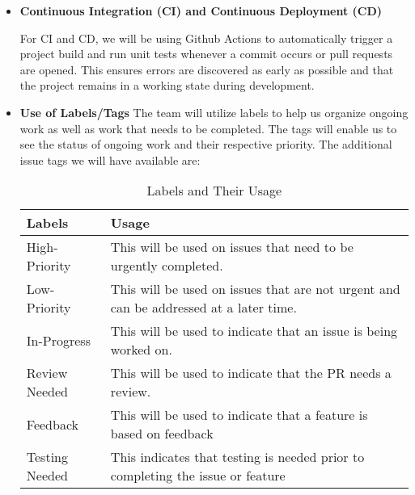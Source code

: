 \documentclass{article}
\begin{document}
\begin{itemize}
	\item\textbf{Continuous Integration (CI) and Continuous Deployment (CD)}
	
  For CI and CD, we will be using Github Actions to automatically trigger a project build and run unit tests 
  whenever a commit occurs or pull requests are opened. This ensures errors are discovered as early as possible 
  and that the project remains in a working state during development. 

  \item \textbf{Use of Labels/Tags} \newline
  The team will utilize labels to help us organize ongoing work as well as work that needs to be completed. The tags will enable us to see the status of ongoing work and their respective priority. 
    The additional issue tags we will have available are:

    \begin{table}[!htbp]
      \centering
      \caption{Labels and Their Usage}
      \begin{tabular}{|p{4cm}|p{4cm}|}
      \hline
      \textbf{Labels} & \textbf{Usage} \\
      \hline
      High-Priority & This will be used on issues that need to be urgently completed.\\
      \hline
      Low-Priority & This will be used on issues that are not urgent and can be addressed at a later time.\\
      \hline
      In-Progress & This will be used to indicate that an issue is being worked on.\\
      \hline 
      Review Needed & This will be used to indicate that the PR needs a review.\\
      \hline
      Feedback & This will be used to indicate that a feature is based on feedback \\ 
      \hline
      Testing Needed & This indicates that testing is needed prior to completing the issue or feature\\
      \hline
      \end{tabular}
    \end{table}



\end{itemize}
\end{document}
